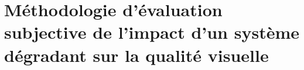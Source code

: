\chapter{Méthodologie d'évaluation subjective de l'impact d'un système dégradant sur la qualité visuelle} \label{chap:methode}

